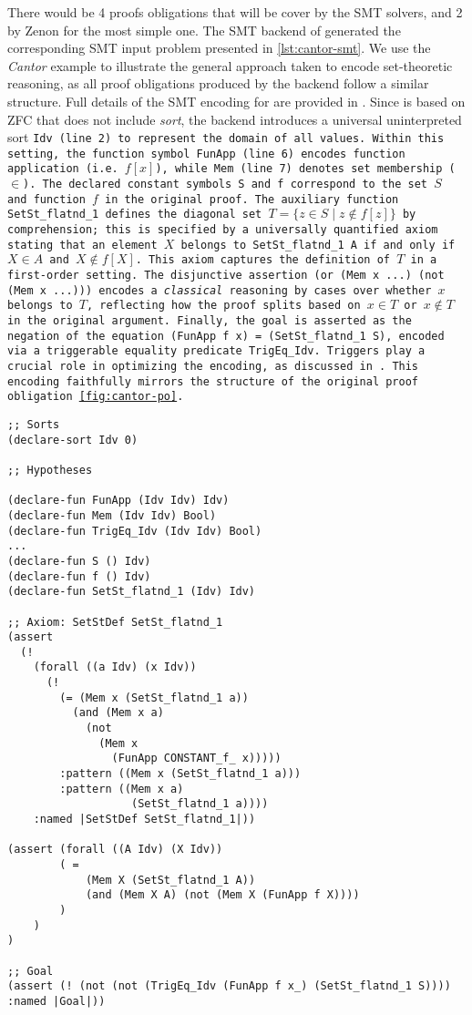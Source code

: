 There would be 4 proofs obligations that will be cover by the SMT solvers, and 2 by Zenon for the most simple one. 
The SMT backend of \tlaplus generated the corresponding SMT input problem presented in \cref{lst:cantor-smt}.
We use the \textit{Cantor} example to illustrate the general approach taken to encode set-theoretic reasoning, as all proof obligations produced by the backend follow a similar structure.
Full details of the SMT encoding for \tlaplus are provided in \cite{new-encoding-tlaps}.
Since \tlaplus is based on ZFC that does not include \emph{sort}, the backend introduces a universal uninterpreted sort \tt{Idv} (line 2) to represent the domain of all values.
Within this setting, the function symbol \tt{FunApp} (line 6) encodes function application (i.e. $f[x]$), while \tt{Mem} (line 7) denotes set membership ($\in$).
The declared constant symbols \tt{S} and \tt{f} correspond to the set $S$ and function $f$ in the original proof.
The auxiliary function \tt{SetSt\_flatnd\_1} defines the diagonal set $T = \{ z \in S \mid z \notin f[z] \}$ by comprehension; this is specified by a universally quantified axiom stating that an element $X$ belongs to \tt{SetSt\_flatnd\_1 A} if and only if $X \in A$ and $X \notin f[X]$.
This axiom captures the definition of $T$ in a first-order setting.
The disjunctive assertion \tt{(or (Mem x ...) (not (Mem x ...)))} encodes a \emph{classical} reasoning by cases over whether $x$ belongs to $T$, reflecting how the proof splits based on $x \in T$ or $x \notin T$ in the original \tlaplus argument. 
Finally, the goal is asserted as the negation of the equation \tt{(FunApp f x) = (SetSt\_flatnd\_1 S)}, encoded via a triggerable equality predicate \tt{TrigEq\_Idv}.
Triggers play a crucial role in optimizing the encoding, as discussed in \cite[\S3]{new-encoding-tlaps}.
This encoding faithfully mirrors the structure of the original \tlaplus proof obligation \cref{fig:cantor-po}.

\smallskip

\begin{lstlisting}[language=SMT, caption={Proof obligation of step $\ps{1}{6.}$ in Cantor theorem},label={lst:cantor-smt}]
;; Sorts
(declare-sort Idv 0)

;; Hypotheses

(declare-fun FunApp (Idv Idv) Idv)
(declare-fun Mem (Idv Idv) Bool)
(declare-fun TrigEq_Idv (Idv Idv) Bool)
...
(declare-fun S () Idv)
(declare-fun f () Idv)
(declare-fun SetSt_flatnd_1 (Idv) Idv)

;; Axiom: SetStDef SetSt_flatnd_1
(assert
  (!
    (forall ((a Idv) (x Idv))
      (!
        (= (Mem x (SetSt_flatnd_1 a))
          (and (Mem x a)
            (not
              (Mem x
                (FunApp CONSTANT_f_ x)))))
        :pattern ((Mem x (SetSt_flatnd_1 a)))
        :pattern ((Mem x a)
                   (SetSt_flatnd_1 a))))
    :named |SetStDef SetSt_flatnd_1|))

(assert (forall ((A Idv) (X Idv))
        ( = 
            (Mem X (SetSt_flatnd_1 A))
            (and (Mem X A) (not (Mem X (FunApp f X))))
        )
    )
)

;; Goal
(assert (! (not (not (TrigEq_Idv (FunApp f x_) (SetSt_flatnd_1 S)))) :named |Goal|))
\end{lstlisting}

\smallskip